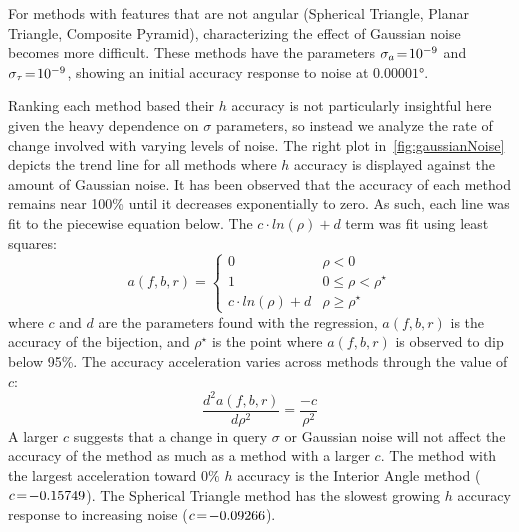 \documentclass[conference]{IEEEtran}
\begin{document}
    For methods with features that are not angular (Spherical Triangle, Planar Triangle, Composite Pyramid),
    characterizing the effect of Gaussian noise becomes more difficult.
    These methods have the parameters $\sigma_a \!=\! 10^{-9}$ and $\sigma_\tau \!=\! 10^{-9}$, showing an initial
    accuracy response to noise at $\ang{0.00001}$.

    Ranking each method based their $h$ accuracy is not particularly insightful here given the heavy dependence on
    $\sigma$ parameters, so instead we analyze the rate of change involved with varying levels of noise.
    The right plot in~\autoref{fig:gaussianNoise} depicts the trend line for all methods where $h$ accuracy is displayed
    against the amount of Gaussian noise.
    It has been observed that the accuracy of each method remains near 100\% until it decreases exponentially to zero.
    As such, each line was fit to the piecewise equation below.
    The $c\cdot \mathit{ln}(\rho) + d$ term was fit using least squares:
    \begin{equation}
        a(f, b, r) =
        \begin{cases}
            0 & \rho < 0 \\
            1 & 0 \leq \rho < \rho^{\star} \\
            c \cdot \mathit{ln}(\rho) + d & \rho \geq \rho^{\star}
        \end{cases}
    \end{equation}
    where $c$ and $d$ are the parameters found with the regression, $a(f, b, r)$ is the accuracy of the bijection, and
    $\rho^{\star}$ is the point where $a(f, b, r)$ is observed to dip below 95\%.
    The accuracy acceleration varies across methods through the value of $c$:
    \begin{equation}
        \frac{d^{2}a(f, b, r)}{d\rho^2} = \frac{-c}{\rho^2}
    \end{equation}
    A larger $c$ suggests that a change in query $\sigma$ or Gaussian noise will not affect the accuracy of the method
    as much as a method with a larger $c$.
    The method with the largest acceleration toward $0\%$ $h$ accuracy is the Interior Angle method ($c \!=\! -0.15749$).
    The Spherical Triangle method has the slowest growing $h$ accuracy response to increasing noise ($c \!=\! -0.09266$).
\end{document}
